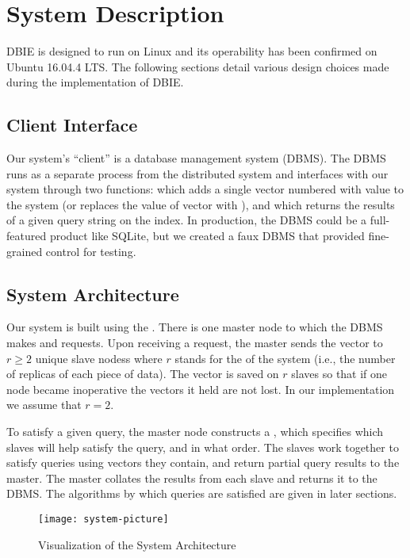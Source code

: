 \section{System Description}
DBIE is designed to run on Linux and its operability has been confirmed on
Ubuntu 16.04.4 LTS. The following sections detail various design choices made
during the implementation of DBIE.
%
\subsection{Client Interface}
Our system's ``client'' is a database management system (DBMS). The DBMS runs
as a separate process from the distributed system and interfaces with our
system through two functions:  which adds a single vector
numbered  with value  to the system (or replaces the value of
vector  with ), and  which returns the results
of a given query string  on the index. In production, the DBMS could be
a full-featured product like SQLite, but we created a faux DBMS that provided
fine-grained control for testing.
%
\subsection{System Architecture}
Our system is built using the . There is one
master node to which the DBMS makes  and  requests.
Upon receiving a  request, the master sends the vector to
\(r \geq 2\) unique slave nodess where \(r\) stands for the
 of the system (i.e., the number of replicas of each
piece of data). The vector is saved on \(r\) slaves so that if
one node became inoperative the vectors it held are not lost. In our
implementation we assume that \(r = 2\).
\par
To satisfy a given query, the master node constructs a ,
which specifies which slaves will help satisfy the query, and
in what order. The slaves work together to satisfy queries using vectors they
contain, and return partial query results to the master. The master
collates the results from each slave and returns it to the DBMS.
The algorithms by which queries are satisfied are given in later sections.
%
\begin{figure}
    \texttt{[image: system-picture]}
    \caption{Visualization of the System Architecture}
    \label{fig:system-visualization}
\end{figure}
%
